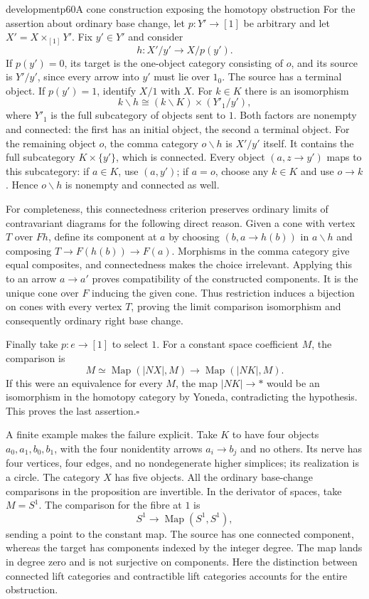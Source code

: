 \begin{dcomment}{development}{p60}{A cone construction exposing the homotopy obstruction}
For the assertion about ordinary base change, let $p:Y'\to[1]$ be arbitrary and let $X'=X\times_{[1]}Y'$. Fix $y'\in Y'$ and consider
\[
 h:X'/y'\longrightarrow X/p(y').
\]
If $p(y')=0$, its target is the one-object category consisting of $o$, and its source is $Y'/y'$, since every arrow into $y'$ must lie over $1_0$. The source has a terminal object. If $p(y')=1$, identify $X/1$ with $X$. For $k\in K$ there is an isomorphism
\[
 k\backslash h\cong(k\backslash K)\times(Y'_1/y'),
\]
where $Y'_1$ is the full subcategory of objects sent to $1$. Both factors are nonempty and connected: the first has an initial object, the second a terminal object. For the remaining object $o$, the comma category $o\backslash h$ is $X'/y'$ itself. It contains the full subcategory $K\times\{y'\}$, which is connected. Every object $(a,z\to y')$ maps to this subcategory: if $a\in K$, use $(a,y')$; if $a=o$, choose any $k\in K$ and use $o\to k$. Hence $o\backslash h$ is nonempty and connected as well.

For completeness, this connectedness criterion preserves ordinary limits of contravariant diagrams for the following direct reason. Given a cone with vertex $T$ over $Fh$, define its component at $a$ by choosing $(b,a\to h(b))$ in $a\backslash h$ and composing $T\to F(h(b))\to F(a)$. Morphisms in the comma category give equal composites, and connectedness makes the choice irrelevant. Applying this to an arrow $a\to a'$ proves compatibility of the constructed components. It is the unique cone over $F$ inducing the given cone. Thus restriction induces a bijection on cones with every vertex $T$, proving the limit comparison isomorphism and consequently ordinary right base change.

Finally take $p:e\to[1]$ to select $1$. For a constant space coefficient $M$, the comparison is
\[
 M\simeq\operatorname{Map}(|NX|,M)
 \longrightarrow\operatorname{Map}(|NK|,M).
\]
If this were an equivalence for every $M$, the map $|NK|\to *$ would be an isomorphism in the homotopy category by Yoneda, contradicting the hypothesis. This proves the last assertion.\hfill$\square$

A finite example makes the failure explicit. Take $K$ to have four objects $a_0,a_1,b_0,b_1$, with the four nonidentity arrows $a_i\to b_j$ and no others. Its nerve has four vertices, four edges, and no nondegenerate higher simplices; its realization is a circle. The category $X$ has five objects. All the ordinary base-change comparisons in the proposition are invertible. In the derivator of spaces, take $M=S^1$. The comparison for the fibre at $1$ is
\[
 S^1\longrightarrow\operatorname{Map}(S^1,S^1),
\]
sending a point to the constant map. The source has one connected component, whereas the target has components indexed by the integer degree. The map lands in degree zero and is not surjective on components. Here the distinction between connected lift categories and contractible lift categories accounts for the entire obstruction.
\end{dcomment}



